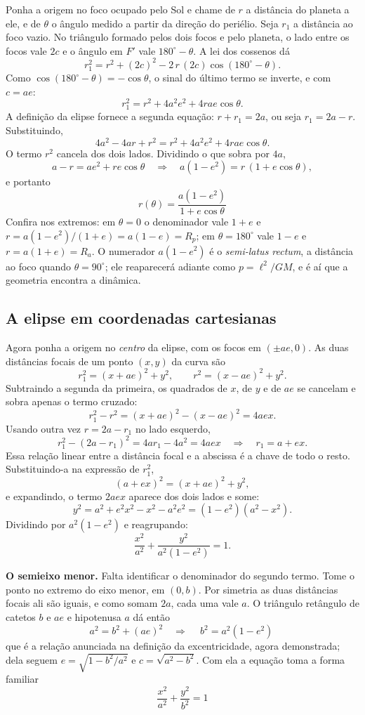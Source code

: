 \documentclass[11pt,a4paper]{article}
\begin{document}
Ponha a origem no foco ocupado pelo Sol e chame de $r$ a distância do planeta a ele, e de $\theta$ o ângulo medido a partir da direção do periélio. Seja $r_1$ a distância ao foco vazio. No triângulo formado pelos dois focos e pelo planeta, o lado entre os focos vale $2c$ e o ângulo em $F'$ vale $180^{\circ}-\theta$. A lei dos cossenos dá
\[
r_1^{2}=r^{2}+(2c)^{2}-2\,r\,(2c)\cos(180^{\circ}-\theta).
\]
Como $\cos(180^{\circ}-\theta)=-\cos\theta$, o sinal do último termo se inverte, e com $c=ae$:
\[
r_1^{2}=r^{2}+4a^{2}e^{2}+4rae\cos\theta.
\]
A definição da elipse fornece a segunda equação: $r+r_1=2a$, ou seja $r_1=2a-r$. Substituindo,
\[
4a^{2}-4ar+r^{2}=r^{2}+4a^{2}e^{2}+4rae\cos\theta.
\]
O termo $r^{2}$ cancela dos dois lados. Dividindo o que sobra por $4a$,
\[
a-r=ae^{2}+re\cos\theta
\quad\Longrightarrow\quad
a(1-e^{2})=r\,(1+e\cos\theta),
\]
e portanto
\[
\boxed{\ r(\theta)=\frac{a(1-e^{2})}{1+e\cos\theta}\ }
\]
Confira nos extremos: em $\theta=0$ o denominador vale $1+e$ e $r=a(1-e^{2})/(1+e)=a(1-e)=R_p$; em $\theta=180^{\circ}$ vale $1-e$ e $r=a(1+e)=R_a$. O numerador $a(1-e^{2})$ é o \textit{semi-latus rectum}, a distância ao foco quando $\theta=90^{\circ}$; ele reaparecerá adiante como $p=\ell^{2}/GM$, e é aí que a geometria encontra a dinâmica.

\subsection*{A elipse em coordenadas cartesianas}

Agora ponha a origem no \textit{centro} da elipse, com os focos em $(\pm ae,0)$. As duas distâncias focais de um ponto $(x,y)$ da curva são
\[
r_1^{2}=(x+ae)^{2}+y^{2},
\qquad
r^{2}=(x-ae)^{2}+y^{2}.
\]
Subtraindo a segunda da primeira, os quadrados de $x$, de $y$ e de $ae$ se cancelam e sobra apenas o termo cruzado:
\[
r_1^{2}-r^{2}=(x+ae)^{2}-(x-ae)^{2}=4aex.
\]
Usando outra vez $r=2a-r_1$ no lado esquerdo,
\[
r_1^{2}-(2a-r_1)^{2}=4ar_1-4a^{2}=4aex
\quad\Longrightarrow\quad
r_1=a+ex.
\]
Essa relação linear entre a distância focal e a abscissa é a chave de todo o resto. Substituindo-a na expressão de $r_1^{2}$,
\[
(a+ex)^{2}=(x+ae)^{2}+y^{2},
\]
e expandindo, o termo $2aex$ aparece dos dois lados e some:
\[
y^{2}=a^{2}+e^{2}x^{2}-x^{2}-a^{2}e^{2}=(1-e^{2})(a^{2}-x^{2}).
\]
Dividindo por $a^{2}(1-e^{2})$ e reagrupando:
\[
\frac{x^{2}}{a^{2}}+\frac{y^{2}}{a^{2}(1-e^{2})}=1 .
\]

\textbf{O semieixo menor.} Falta identificar o denominador do segundo termo. Tome o ponto no extremo do eixo menor, em $(0,b)$. Por simetria as duas distâncias focais ali são iguais, e como somam $2a$, cada uma vale $a$. O triângulo retângulo de catetos $b$ e $ae$ e hipotenusa $a$ dá então
\[
a^{2}=b^{2}+(ae)^{2}
\quad\Longrightarrow\quad
\boxed{\ b^{2}=a^{2}(1-e^{2})\ }
\]
que é a relação anunciada na definição da excentricidade, agora demonstrada; dela seguem $e=\sqrt{1-b^{2}/a^{2}}$ e $c=\sqrt{a^{2}-b^{2}}$. Com ela a equação toma a forma familiar
\[
\boxed{\ \frac{x^{2}}{a^{2}}+\frac{y^{2}}{b^{2}}=1\ }
\]
\end{document}

